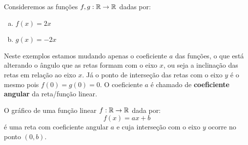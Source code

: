 \begin{itemize}
  Consideremos as funções $f, g: \mathbb{R} \to \mathbb{R}$ dadas por:
 \begin{enumerate}[a)]
  \item $f(x)= 2x$
  \item $g(x)= -2x$
 \end{enumerate}

 \begin{figure}[H]
  \end{figure}
  Neste exemplos estamos mudando apenas o coeficiente $a$ das funções, o que está alterando o ângulo que as retas formam com o eixo $x$, ou seja a inclinação das retas em relação ao eixo $x$. Já o ponto de interseção das retas com o eixo $y$ é o mesmo pois $f(0)= g(0)= 0$. O coeficiente $a$ é chamado de \textbf{coeficiente angular} da reta/função linear.

   \vskip0.3cm
 \colorbox{amarelo}{
 \begin{minipage}{0.9\linewidth}
 \begin{center}
 O gráfico de uma função linear $f: \mathbb{R} \to \mathbb{R}$ dada por:
 \[f(x) = ax + b\]
 é uma reta com coeficiente angular $a$ e cuja interseção com o eixo $y$ ocorre no ponto $(0, b)$.
 \end{center}
 \end{minipage}}
 \vskip0.3cm


\end{itemize}
